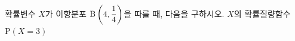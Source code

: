 확률변수 $X$가 이항분포 $\mathrm{B}\left(4{,}\mkern3mu\mathopen{}\dfrac{1}{4}\right)$을 따를 때, 다음을 구하시오.
 $X$의 확률질량함수
 $\mathrm{P}(X=3)$
